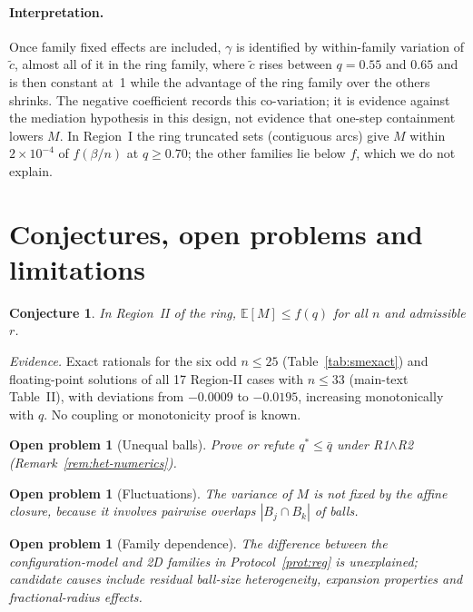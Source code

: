 \documentclass[aps,pre,onecolumn,superscriptaddress,amsmath,amssymb,longbibliography]{revtex4-2}
\newtheorem{conjecture}[theorem]{Conjecture}
\newtheorem{openq}[theorem]{Open problem}
\theoremstyle{definition}
\theoremstyle{remark}
\newcommand{\ctil}{\tilde c}
\newcommand{\E}{\mathbb{E}}
\begin{document}
\paragraph*{Interpretation.} Once family fixed effects are included,
$\gamma$ is identified by within-family variation of $\ctil$, almost all
of it in the ring family, where $\ctil$ rises between $q=0.55$ and $0.65$
and is then constant at~1 while the advantage of the ring family over the
others shrinks. The negative coefficient records this co-variation; it is
evidence against the mediation hypothesis in this design, not evidence
that one-step containment lowers $M$. In Region~I the ring truncated
sets (contiguous arcs) give $M$ within $2\times10^{-4}$ of $f(\beta/n)$ at
$q\ge0.70$; the other families lie below $f$, which we do not explain.

\section{Conjectures, open problems and limitations}
\label{sec:S8}

\begin{conjecture}
\label{conj:upper}
In Region~II of the ring, $\E[M]\le f(q)$ for all $n$ and admissible $r$.
\end{conjecture}
\emph{Evidence.} Exact rationals for the six odd $n\le25$
(Table~\ref{tab:smexact}) and floating-point solutions of all 17
Region-II cases with $n\le33$ (main-text Table~II), with deviations from
$-0.0009$ to $-0.0195$, increasing monotonically with $q$. No coupling or
monotonicity proof is known.

\begin{openq}[Unequal balls]
Prove or refute $q^\ast\le\bar q$ under R1$\wedge$R2
(Remark~\ref{rem:het-numerics}).
\end{openq}

\begin{openq}[Fluctuations]
The variance of $M$ is not fixed by the affine closure, because it
involves pairwise overlaps $|B_j\cap B_k|$ of balls.
\end{openq}

\begin{openq}[Family dependence]
The difference between the configuration-model and 2D families in
Protocol~\ref{prot:reg} is unexplained; candidate causes include residual
ball-size heterogeneity, expansion properties and fractional-radius
effects.
\end{openq}
\end{document}
